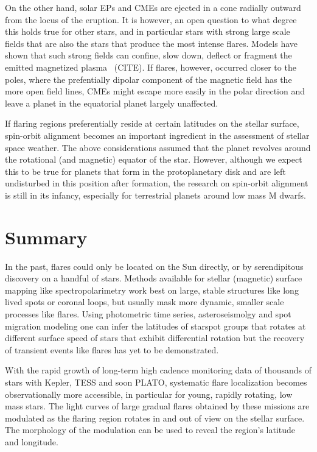 \documentclass[proof]{WileyASNA-v1}
\begin{document}
On the other hand, solar EPs and CMEs are ejected in a cone radially outward from the locus of the eruption. It is however, an open question to what degree this holds true for other stars, and in particular stars with strong large scale fields that are also the stars that produce the most intense flares.
Models have shown that such strong fields can confine, slow down, deflect or fragment the emitted magnetized plasma~\citep{alvaradogomez2018, alvaradogomez2019, kay2019} (CITE). If flares, however, occurred closer to the poles, where the prefentially dipolar component of the magnetic field has the more open field lines, CMEs might escape more easily in the polar direction and leave a planet in the equatorial planet largely unaffected.
      
If flaring regions preferentially reside at certain latitudes on the stellar surface, spin-orbit alignment becomes an important ingredient in the assessment of stellar space weather. 
The above considerations assumed that the planet revolves around the rotational (and magnetic) equator of the star.
However, although we expect this to be true for planets that form in the protoplanetary disk and are left undisturbed in this position after formation, the research on spin-orbit alignment is still in its infancy, especially for terrestrial planets around low mass M dwarfs.

\section{Summary}\label{sec:summary}
In the past, flares could only be located on the Sun directly, or by serendipitous discovery on a handful of stars. 
Methods available for stellar (magnetic) surface mapping like spectropolarimetry work best on large, stable structures like long lived spots or coronal loops, but usually mask more dynamic, smaller scale processes like flares. 
Using photometric time series, asteroseismolgy and spot migration modeling one can infer the latitudes of starspot groups that rotates at different surface speed of stars that exhibit differential rotation but the recovery of transient events like flares has yet to be demonstrated.

With the rapid growth of long-term high cadence monitoring data of thousands of stars with Kepler, TESS and soon PLATO, systematic flare localization becomes observationally more accessible, in particular for young, rapidly rotating, low mass stars.
The light curves of large gradual flares obtained by these missions are modulated as the flaring region rotates in and out of view on the stellar surface. The morphology of the modulation can be used to reveal the region's latitude and longitude.
\end{document}
